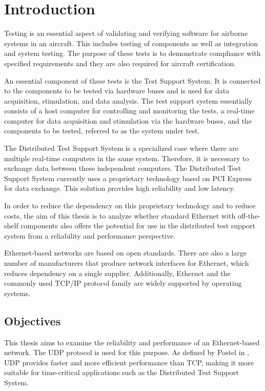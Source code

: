 \chapter{Introduction} \label{chap:introduction}
Testing is an essential aspect of validating and verifying software for airborne systems in an aircraft. This includes testing of components as well as integration and system testing. The purpose of these tests is to demonstrate compliance with specified requirements and they are also required for aircraft certification.

An essential component of these tests is the Test Support System. It is connected to the components to be tested via hardware buses and is used for data acquisition, stimulation, and data analysis. The test support system essentially consists of a host computer for controlling and monitoring the tests, a real-time computer for data acquisition and stimulation via the hardware buses, and the components to be tested, referred to as the system under test.

The Distributed Test Support System is a specialized case where there are multiple real-time computers in the same system. Therefore, it is necessary to exchange data between these independent computers. The Distributed Test Support System currently uses a proprietary technology based on PCI Express for data exchange. This solution provides high reliability and low latency.

In order to reduce the dependency on this proprietary technology and to reduce costs, the aim of this thesis is to analyze whether standard Ethernet with off-the-shelf components also offers the potential for use in the distributed test support system from a reliability and performance perspective.

Ethernet-based networks are based on open standards. There are also a large number of manufacturers that produce network interfaces for Ethernet, which reduces dependency on a single supplier. Additionally, Ethernet and the commonly used TCP/IP protocol family are widely supported by operating systems.


\section{Objectives} \label{chap:introduction:research_questions}
This thesis aims to examine the reliability and performance of an Ethernet-based network. The UDP protocol is used for this purpose. As defined by Postel in \cite{introRelW04}, UDP provides faster and more efficient performance than TCP, making it more suitable for time-critical applications such as the Distributed Test Support System.

